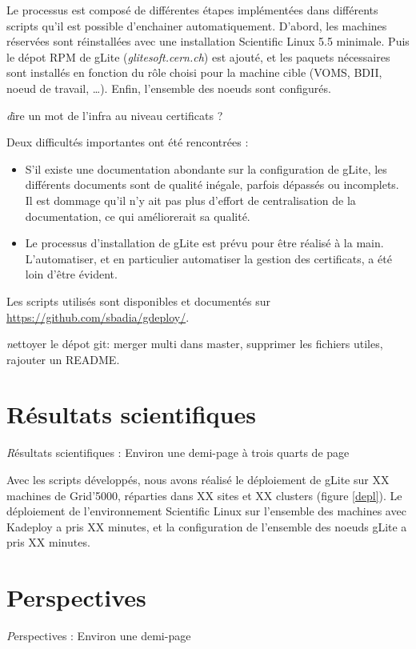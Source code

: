 \documentclass[a4paper,11pt]{article}
\newcommand{\todo}[1]{{\color{red}\textsl #1}}
\begin{document}
Le processus est composé de différentes étapes implémentées dans différents
scripts qu'il est possible d'enchainer automatiquement.  D'abord, les machines
réservées sont réinstallées avec une installation Scientific Linux 5.5
minimale. Puis le dépot RPM de gLite (\textsl{glitesoft.cern.ch}) est ajouté,
et les paquets nécessaires sont installés en fonction du rôle choisi pour la
machine cible (VOMS, BDII, noeud de travail, \ldots). Enfin, l'ensemble des
noeuds sont configurés.

\todo{dire un mot de l'infra au niveau certificats ?}

Deux difficultés importantes ont été rencontrées :

\begin{itemize}

\item S'il existe une documentation abondante sur la configuration de gLite,
	les différents documents sont de qualité inégale, parfois dépassés ou
	incomplets. Il est dommage qu'il n'y ait pas  plus d'effort de
	centralisation de la documentation, ce qui améliorerait sa qualité.

\item Le processus d'installation de gLite est prévu pour être réalisé à la
	main. L'automatiser, et en particulier automatiser la gestion des
	certificats, a été loin d'être évident.

\end{itemize}

Les scripts utilisés sont disponibles et documentés sur \url{https://github.com/sbadia/gdeploy/}.

\todo{nettoyer le dépot git: merger multi dans master, supprimer les fichiers utiles, rajouter un README.}

\section{Résultats scientifiques}
\todo{Résultats scientifiques : Environ une demi-page à trois quarts de page}

Avec les scripts développés, nous avons réalisé le déploiement de gLite sur XX
machines de Grid'5000, réparties dans XX sites et XX clusters (figure
\ref{depl}). Le déploiement de l'environnement Scientific Linux sur l'ensemble
des machines avec Kadeploy a pris XX minutes, et la configuration de l'ensemble
des noeuds gLite a pris XX minutes.

\section{Perspectives}
\todo{Perspectives : Environ une demi-page}
\end{document}
